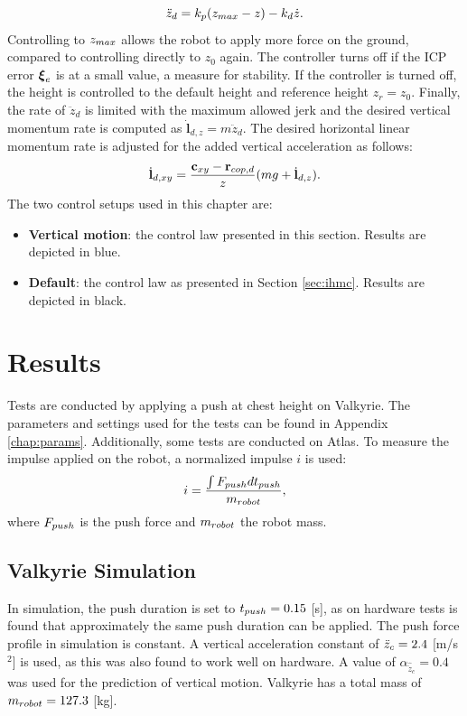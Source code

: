 \begin{equation}
	\ddot{z}_d = k_p(z_{max}-z)-k_d\dot{z}.
\end{equation}
Controlling to $z_{max}$ allows the robot to apply more force on the ground, compared to controlling directly to $z_0$ again. The controller turns off if the \ac{ICP} error $\boldsymbol{\xi}_e$ is at a small value, a measure for stability. If the controller is turned off, the height is controlled to the default height and reference height $z_r=z_0$. Finally, the rate of $\ddot{z}_d$ is limited with the maximum allowed jerk and the desired vertical momentum rate is computed as $\dot{\mathbf{l}}_{d,z}=m\ddot{z}_d$. The desired horizontal linear momentum rate is adjusted for the added vertical acceleration as follows:
\begin{equation}
    \dot{\mathbf{l}}_{d,xy}= \frac{\mathbf{c}_{xy}-\mathbf{r}_{cop,d}}{z}(mg+\dot{\mathbf{l}}_{d,z}).
\end{equation}
The two control setups used in this chapter are:
\begin{itemize}
\item \textbf{Vertical motion}: the control law presented in this section. Results are depicted in blue.
\item \textbf{Default}: the control law as presented in Section \ref{sec:ihmc}. Results are depicted in black.
\end{itemize}
\section{Results}
Tests are conducted by applying a push at chest height on Valkyrie. The parameters and settings used for the tests can be found in Appendix \ref{chap:params}. Additionally, some tests are conducted on Atlas. To measure the impulse applied on the robot, a normalized impulse $i$ is used:
\begin{equation}
	i = \frac{\int F_{push} dt_{push}}{m_{robot}},
\end{equation}
where $F_{push}$ is the push force and $m_{robot}$ the robot mass.
\subsection{Valkyrie Simulation}
In simulation, the push duration is set to $t_{push}=0.15$ [s], as on hardware tests is found that approximately the same push duration can be applied. The push force profile in simulation is constant. A vertical acceleration constant of $\ddot{z}_{c}=2.4$ [m/s$^2$] is used, as this was also found to work well on hardware. A value of $\alpha_{\hat{\ddot{z}}_{c}}=0.4$ was used for the prediction of vertical motion. Valkyrie has a total mass of $m_{robot}=127.3$ [kg].

